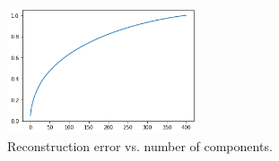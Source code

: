 \begin{enumerate}
\begin{figure}[H]
	\centering
	\includegraphics[width=0.5\textwidth]{templates/var_plot3}
	\caption{Reconstruction error vs. number of components.}
	\label{fig:my_label}
\end{figure}

\end{enumerate}